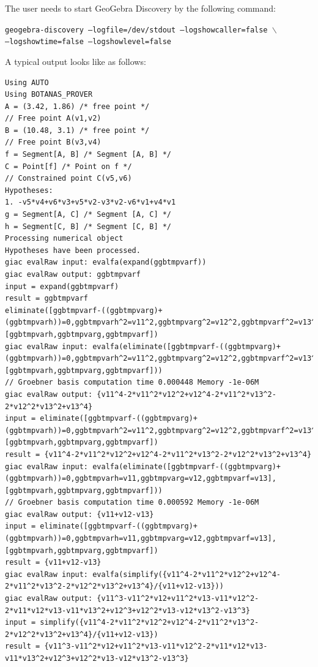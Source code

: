 \documentclass{article}
\begin{document}
The user needs to start GeoGebra Discovery by the following command:
{
    \begin{center}
        \texttt{geogebra-discovery --logfile=/dev/stdout --logshowcaller=false $\backslash$\\ --logshowtime=false --logshowlevel=false} 
    \end{center}
} %
A typical output looks like as follows:
{
\scriptsize
\begin{lstlisting}[language=mylog]
Using AUTO
Using BOTANAS_PROVER
A = (3.42, 1.86) /* free point */
// Free point A(v1,v2)
B = (10.48, 3.1) /* free point */
// Free point B(v3,v4)
f = Segment[A, B] /* Segment [A, B] */
C = Point[f] /* Point on f */
// Constrained point C(v5,v6)
Hypotheses:
1. -v5*v4+v6*v3+v5*v2-v3*v2-v6*v1+v4*v1
g = Segment[A, C] /* Segment [A, C] */
h = Segment[C, B] /* Segment [C, B] */
Processing numerical object
Hypotheses have been processed.
giac evalRaw input: evalfa(expand(ggbtmpvarf))
giac evalRaw output: ggbtmpvarf
input = expand(ggbtmpvarf)
result = ggbtmpvarf
eliminate([ggbtmpvarf-((ggbtmpvarg)+(ggbtmpvarh))=0,ggbtmpvarh^2=v11^2,ggbtmpvarg^2=v12^2,ggbtmpvarf^2=v13^2],[ggbtmpvarh,ggbtmpvarg,ggbtmpvarf])
giac evalRaw input: evalfa(eliminate([ggbtmpvarf-((ggbtmpvarg)+(ggbtmpvarh))=0,ggbtmpvarh^2=v11^2,ggbtmpvarg^2=v12^2,ggbtmpvarf^2=v13^2],[ggbtmpvarh,ggbtmpvarg,ggbtmpvarf]))
// Groebner basis computation time 0.000448 Memory -1e-06M
giac evalRaw output: {v11^4-2*v11^2*v12^2+v12^4-2*v11^2*v13^2-2*v12^2*v13^2+v13^4}
input = eliminate([ggbtmpvarf-((ggbtmpvarg)+(ggbtmpvarh))=0,ggbtmpvarh^2=v11^2,ggbtmpvarg^2=v12^2,ggbtmpvarf^2=v13^2],[ggbtmpvarh,ggbtmpvarg,ggbtmpvarf])
result = {v11^4-2*v11^2*v12^2+v12^4-2*v11^2*v13^2-2*v12^2*v13^2+v13^4}
giac evalRaw input: evalfa(eliminate([ggbtmpvarf-((ggbtmpvarg)+(ggbtmpvarh))=0,ggbtmpvarh=v11,ggbtmpvarg=v12,ggbtmpvarf=v13],[ggbtmpvarh,ggbtmpvarg,ggbtmpvarf]))
// Groebner basis computation time 0.000592 Memory -1e-06M
giac evalRaw output: {v11+v12-v13}
input = eliminate([ggbtmpvarf-((ggbtmpvarg)+(ggbtmpvarh))=0,ggbtmpvarh=v11,ggbtmpvarg=v12,ggbtmpvarf=v13],[ggbtmpvarh,ggbtmpvarg,ggbtmpvarf])
result = {v11+v12-v13}
giac evalRaw input: evalfa(simplify({v11^4-2*v11^2*v12^2+v12^4-2*v11^2*v13^2-2*v12^2*v13^2+v13^4}/{v11+v12-v13}))
giac evalRaw output: {v11^3-v11^2*v12+v11^2*v13-v11*v12^2-2*v11*v12*v13-v11*v13^2+v12^3+v12^2*v13-v12*v13^2-v13^3}
input = simplify({v11^4-2*v11^2*v12^2+v12^4-2*v11^2*v13^2-2*v12^2*v13^2+v13^4}/{v11+v12-v13})
result = {v11^3-v11^2*v12+v11^2*v13-v11*v12^2-2*v11*v12*v13-v11*v13^2+v12^3+v12^2*v13-v12*v13^2-v13^3}

\end{lstlisting}}
\end{document}
